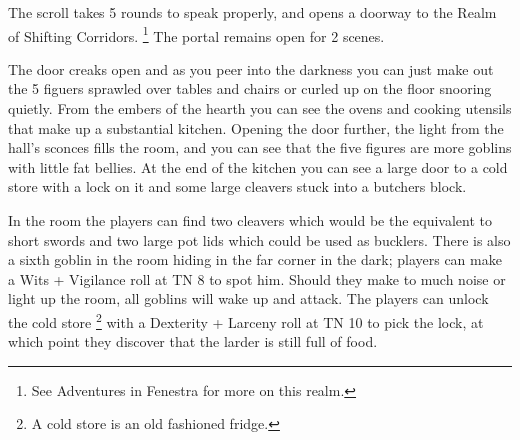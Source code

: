\begin{multicols}{2}

The scroll takes 5 rounds to speak properly, and opens a doorway to the Realm of Shifting Corridors.%
\footnote{See Adventures in Fenestra for more on this realm.}
The portal remains open for 2 scenes.





\goblinnuramancer

\goblin


\begin{boxtext}

The door creaks open and as you peer into the darkness you can just make out the 5 figuers sprawled over tables and chairs or curled up on the floor snooring quietly. 
From the embers of the hearth you can see the ovens and cooking utensils that make up a substantial kitchen. 
Opening the door further, the light from the hall's sconces fills the room, and you can see that the five figures are more goblins with little fat bellies.
At the end of the kitchen you can see a large door to a cold store with a lock on it and some large cleavers stuck into a butchers block.

\end{boxtext}

\noindent
In the room the players can find two cleavers which would be the equivalent to short swords and two large pot lids which could be used as bucklers.
There is also a sixth goblin in the room hiding in the far corner in the dark; players can make a Wits + Vigilance roll at TN 8 to spot him.
Should they make to much noise or light up the room, all goblins will wake up and attack.
The players can unlock the cold store
\footnote{A cold store is an old fashioned fridge.}%
with a Dexterity + Larceny roll at TN 10 to pick the lock, at which point they discover that the larder is still full of food.






\begin{boxtext}


\end{boxtext}
\end{multicols}

